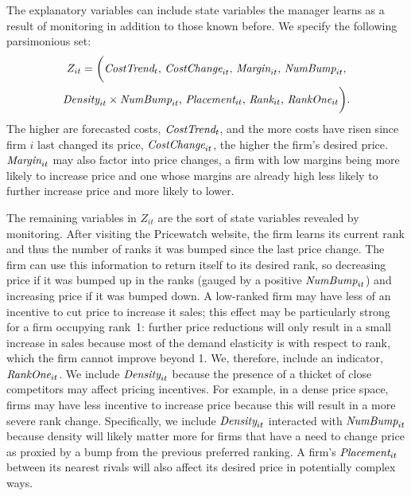 \documentclass[11pt]{article}
\newcommand{\Margin}{\mbox{\it Margin}}
\newcommand{\Rank}{\mbox{\it Rank}}
\newcommand{\RankOne}{\mbox{\it RankOne}}
\newcommand{\NumBump}{\mbox{\it NumBump}}
\newcommand{\Placement}{\mbox{\it Placement}}
\newcommand{\Density}{\mbox{\it Density}}
\newcommand{\CostTrend}{\mbox{\it CostTrend}}
\newcommand{\CostChange}{\mbox{\it CostChange}}
\begin{document}
\begin{spacing}{1.3}
The explanatory variables can include state variables the manager
learns as a result of monitoring in addition to those known before. We
specify the following parsimonious set:
\begin{multline}
\label{Z}
Z_{it} = \biggl(\CostTrend_t, \, \CostChange_{it}, \, \Margin_{it}, \, \NumBump_{it}, \\
 \Density_{it} \times \NumBump_{it}, \, \Placement_{it}, \, \Rank_{it}, \, \RankOne_{it} \biggr).
\end{multline}
The higher are forecasted costs, $\CostTrend_t$, and the more costs
have risen since firm $i$ last changed its price, $\CostChange_{it}$,
the higher the firm's desired price. $\Margin_{it}$ may also factor
into price changes, a firm with low margins being more likely to
increase price and one whose margins are already high less likely to
further increase price and more likely to lower.

The remaining variables in $Z_{it}$ are the sort of state variables
revealed by monitoring. After visiting the Pricewatch website, the
firm learns its current rank and thus the number of ranks it was
bumped since the last price change. The firm can use this information
to return itself to its desired rank, so decreasing price if it was
bumped up in the ranks (gauged by a positive $\NumBump_{it}$) and
increasing price if it was bumped down. A low-ranked firm may have
less of an incentive to cut price to increase it sales; this effect
may be particularly strong for a firm occupying rank~1: further price
reductions will only result in a small increase in sales because most
of the demand elasticity is with respect to rank, which the firm
cannot improve beyond 1.  We, therefore, include an indicator,
$\RankOne_{it}$. We include $\Density_{it}$ because the presence of a
thicket of close competitors may affect pricing incentives. For
example, in a dense price space, firms may have less incentive to
increase price because this will result in a more severe rank
change. Specifically, we include $\Density_{it}$ interacted with
$\NumBump_{it}$ because density will likely matter more for firms that
have a need to change price as proxied by a bump from the previous
preferred ranking. A firm's $\Placement_{it}$ between its nearest
rivals will also affect its desired price in potentially complex ways.


\end{spacing}
\end{document}
